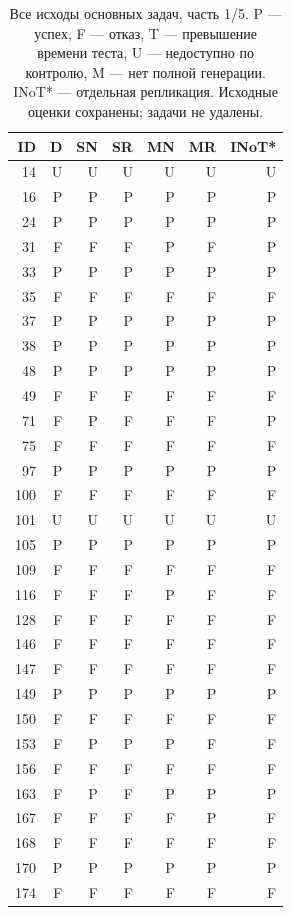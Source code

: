 \begin{table}[!htbp]\centering\footnotesize
\caption{Все исходы основных задач, часть 1/5. P --- успех, F --- отказ, T --- превышение времени теста, U --- недоступно по контролю, M --- нет полной генерации. INoT* --- отдельная репликация. Исходные оценки сохранены; задачи не удалены.}
\begin{tabular*}{\textwidth}{@{\extracolsep{\fill}}rrrrrrr}\toprule
ID & D & SN & SR & MN & MR & INoT*\\\midrule
14 & U & U & U & U & U & U\\
16 & P & P & P & P & P & P\\
24 & P & P & P & P & P & P\\
31 & F & F & F & P & F & P\\
33 & P & P & P & P & P & P\\
35 & F & F & F & F & F & F\\
37 & P & P & P & P & P & P\\
38 & P & P & P & P & P & P\\
48 & P & P & P & P & P & P\\
49 & F & F & F & F & F & F\\
71 & F & P & F & F & F & P\\
75 & F & F & F & F & F & F\\
97 & P & P & P & P & P & P\\
100 & F & F & F & F & F & F\\
101 & U & U & U & U & U & U\\
105 & P & P & P & P & P & P\\
109 & F & F & F & F & F & F\\
116 & F & F & F & P & F & F\\
128 & F & F & F & F & F & F\\
146 & F & F & F & F & F & F\\
147 & F & F & F & F & F & F\\
149 & P & P & P & P & P & P\\
150 & F & F & F & F & F & F\\
153 & F & P & P & P & F & F\\
156 & F & F & F & F & F & F\\
163 & F & P & F & P & P & P\\
167 & F & F & F & F & P & F\\
168 & F & F & F & F & F & F\\
170 & P & P & P & P & P & P\\
174 & F & F & F & F & F & F\\

\end{tabular*}
\end{table}
